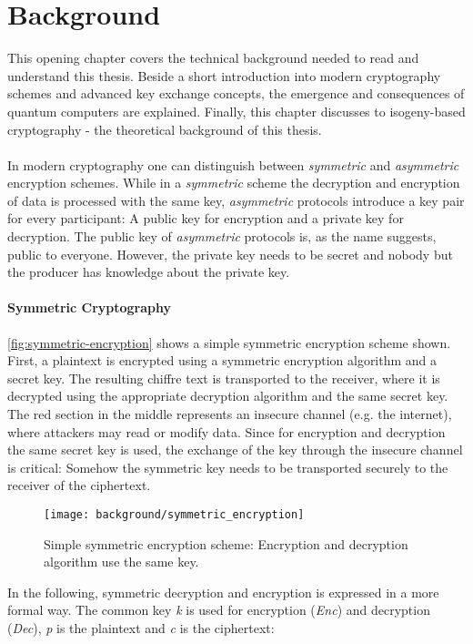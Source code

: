 \chapter{Background}\label{chapter:background}
This opening chapter covers the technical background needed to read and understand this thesis. Beside a short introduction into modern cryptography schemes and advanced key exchange concepts, the emergence and consequences of quantum computers are explained. Finally, this chapter discusses to isogeny-based cryptography - the theoretical background of this thesis.
\\\\
In modern cryptography one can distinguish between \textit{symmetric} and \textit{asymmetric} encryption schemes. While in a \textit{symmetric} scheme the decryption and encryption of data is processed with the same key, \textit{asymmetric} protocols introduce a key pair for every participant: A public key for encryption and a private key for decryption. The public key of \textit{asymmetric} protocols is, as the name suggests, public to everyone. However, the private key needs to be secret and nobody but the producer has knowledge about the private key.

\subsubsection{Symmetric Cryptography}

\autoref{fig:symmetric-encryption} shows a simple symmetric encryption scheme shown. First, a plaintext is encrypted using a symmetric encryption algorithm and a secret key. The resulting chiffre text is transported to the receiver, where it is decrypted using the appropriate decryption algorithm and the same secret key. The red section in the middle represents an insecure channel (e.g. the internet), where attackers may read or modify data. Since for encryption and decryption the same secret key is used, the exchange of the key through the insecure channel is critical: Somehow the symmetric key needs to be transported securely to the receiver of the ciphertext.

\begin{figure}[htpb]
  \centering
  \texttt{[image: background/symmetric\_encryption]}
  \caption[Symmetric encryption scheme]{Simple symmetric encryption scheme: Encryption and decryption algorithm use the same key.} \label{fig:symmetric-encryption}
\end{figure}
In the following, symmetric decryption and encryption is expressed in a more formal way. The common key \textit{k} is used for encryption (\textit{\gls{Enc}}) and decryption (\textit{\gls{Dec}}), \textit{p} is the plaintext and \textit{c} is the ciphertext:

